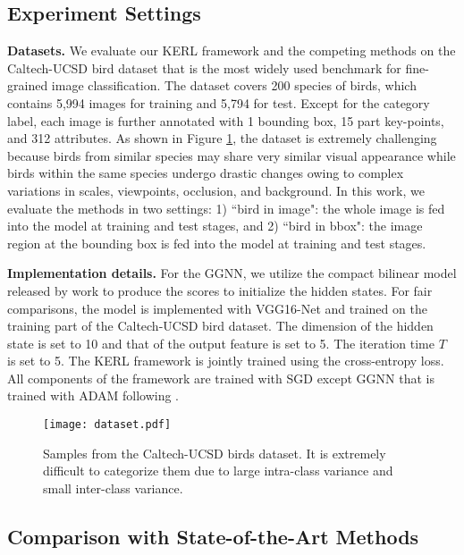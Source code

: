 \documentclass{article}
\begin{document}
\subsection{Experiment Settings}
\label{sec:exp}
\noindent\textbf{Datasets. }We evaluate our KERL framework and the competing methods on the Caltech-UCSD bird dataset \cite{wah2011caltech} that is the most widely used benchmark for fine-grained image classification. The dataset covers 200 species of birds, which contains 5,994 images for training and 5,794 for test. Except for the category label, each image is further annotated with 1 bounding box, 15 part key-points, and 312 attributes. As shown in Figure \ref{fig:dataset}, the dataset is extremely challenging because birds from similar species may share very similar visual appearance while birds within the same species undergo drastic changes owing to complex variations in scales, viewpoints, occlusion, and background. In this work, we evaluate the methods in two settings: 1) ``bird in image": the whole image is fed into the model at training and test stages, and 2) ``bird in bbox": the image region at the bounding box is fed into the model at training and test stages. 


\noindent\textbf{Implementation details. }For the GGNN, we utilize the compact bilinear model released by work \cite{gao2016compact} to produce the scores to initialize the hidden states. For fair comparisons, the model is implemented with VGG16-Net and trained on the training part of the Caltech-UCSD bird dataset. The dimension of the hidden state is set to 10 and that of the output feature is set to 5. The iteration time $T$ is set to 5. The KERL framework is jointly trained using the cross-entropy loss. All components of the framework are trained with SGD except GGNN that is trained with ADAM following \cite{marino2017more}. 


\begin{figure}[!t]
   \centering
   \texttt{[image: dataset.pdf]} %
   \vspace{-6pt}
   \caption{Samples from the Caltech-UCSD birds dataset. It is extremely difficult to categorize them due to large intra-class variance and small inter-class variance.}
   \vspace{-6pt}
   \label{fig:dataset}
\end{figure}



\subsection{Comparison with State-of-the-Art Methods}
\end{document}
